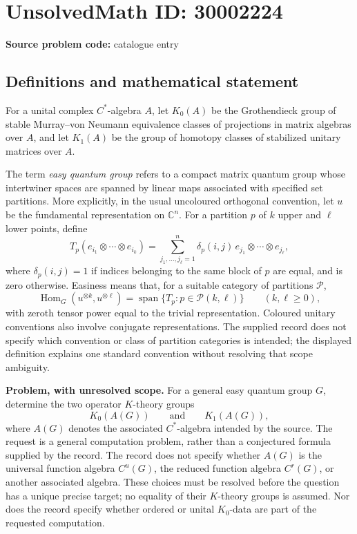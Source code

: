 \documentclass[11pt]{article}
\newcommand{\C}{\mathbb{C}}
\begin{document}
\section*{UnsolvedMath ID: 30002224}
\textbf{Source problem code:} catalogue entry
\subsection{Definitions and mathematical statement}
For a unital complex \(C^*\)-algebra \(A\), let \(K_0(A)\) be the Grothendieck group of stable Murray--von Neumann equivalence classes of projections in matrix algebras over \(A\), and let \(K_1(A)\) be the group of homotopy classes of stabilized unitary matrices over \(A\).

The term \emph{easy quantum group} refers to a compact matrix quantum group whose intertwiner spaces are spanned by linear maps associated with specified set partitions. More explicitly, in the usual uncoloured orthogonal convention, let \(u\) be the fundamental representation on \(\C^n\). For a partition \(p\) of \(k\) upper and \(\ell\) lower points, define
\[
T_p(e_{i_1}\otimes\cdots\otimes e_{i_k})
=\sum_{j_1,\ldots,j_\ell=1}^{n}
\delta_p(i,j)\,e_{j_1}\otimes\cdots\otimes e_{j_\ell},
\]
where \(\delta_p(i,j)=1\) if indices belonging to the same block of \(p\) are equal, and is zero otherwise. Easiness means that, for a suitable category of partitions \(\mathcal P\),
\[
\operatorname{Hom}_G(u^{\otimes k},u^{\otimes\ell})
=\operatorname{span}\{T_p:p\in\mathcal P(k,\ell)\}
\qquad(k,\ell\geq0),
\]
with zeroth tensor power equal to the trivial representation. Coloured unitary conventions also involve conjugate representations. The supplied record does not specify which convention or class of partition categories is intended; the displayed definition explains one standard convention without resolving that scope ambiguity.

\textbf{Problem, with unresolved scope.} For a general easy quantum group \(G\), determine the two operator \(K\)-theory groups
\[
K_0(A(G))\qquad\text{and}\qquad K_1(A(G)),
\]
where \(A(G)\) denotes the associated \(C^*\)-algebra intended by the source. The request is a general computation problem, rather than a conjectured formula supplied by the record. The record does not specify whether \(A(G)\) is the universal function algebra \(C^u(G)\), the reduced function algebra \(C^r(G)\), or another associated algebra. These choices must be resolved before the question has a unique precise target; no equality of their \(K\)-theory groups is assumed. Nor does the record specify whether ordered or unital \(K_0\)-data are part of the requested computation.
\end{document}
